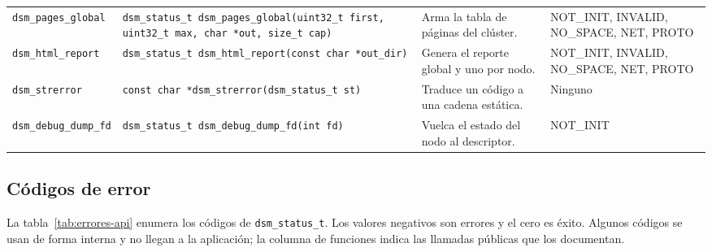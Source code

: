 {\begin{xltabular}{\linewidth}{l P{5.4cm} Y >{\RaggedRight\arraybackslash{}}p{2.7cm}}
\texttt{dsm\_pages\_global} & \texttt{dsm\_status\_t dsm\_pages\_global(uint32\_t first, uint32\_t max, char *out, size\_t cap)} & Arma la tabla de páginas del clúster. & NOT\_INIT, INVALID, NO\_SPACE, NET, PROTO \\
\texttt{dsm\_html\_report} & \texttt{dsm\_status\_t dsm\_html\_report(const char *out\_dir)} & Genera el reporte global y uno por nodo. & NOT\_INIT, INVALID, NO\_SPACE, NET, PROTO \\
\texttt{dsm\_strerror} & \texttt{const char *dsm\_strerror(dsm\_status\_t st)} & Traduce un código a una cadena estática. & Ninguno \\
\texttt{dsm\_debug\_dump\_fd} & \texttt{dsm\_status\_t dsm\_debug\_dump\_fd(int fd)} & Vuelca el estado del nodo al descriptor. & NOT\_INIT \\
\bottomrule
\end{xltabular}
}

\subsection{Códigos de error}

La tabla~\ref{tab:errores-api} enumera los códigos de \texttt{dsm\_status\_t}. Los valores negativos son errores y el cero es éxito. Algunos códigos se usan de forma interna y no llegan a la aplicación; la columna de funciones indica las llamadas públicas que los documentan.

